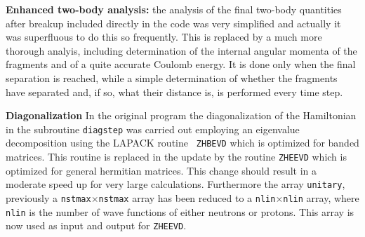 \documentclass[final,1p,twocolumn]{elsarticle}
\begin{document}
\begin{small}
{\bf Enhanced two-body analysis:} the analysis of the final two-body
quantities after breakup included directly in the code was very
simplified and actually it was superfluous to do this so frequently.
This is replaced by a much more thorough analyis, including
determination of the internal angular momenta of the fragments and of
a quite accurate Coulomb energy. It is done only when the final
separation is reached, while a simple determination of whether the
fragments have separated and, if so, what their distance is, is
performed every time step.

 {\bf Diagonalization} In the original program the diagonalization of
 the Hamiltonian in the subroutine {\tt diagstep} was carried out
 employing an eigenvalue decomposition using the LAPACK routine {\tt
   ZHBEVD} which is optimized for banded matrices. This routine is
 replaced in the update by the routine {\tt ZHEEVD} which is optimized
 for general hermitian matrices. This change should result in a
 moderate speed up for very large calculations. Furthermore the array
 {\tt unitary}, previously a {\tt nstmax}$\times${\tt nstmax} array
 has been reduced to a {\tt nlin}$\times${\tt nlin} array, where {\tt
   nlin} is the number of wave functions of either neutrons or
 protons. This array is now used as input and output for {\tt ZHEEVD}.


\end{small}
\end{document}
